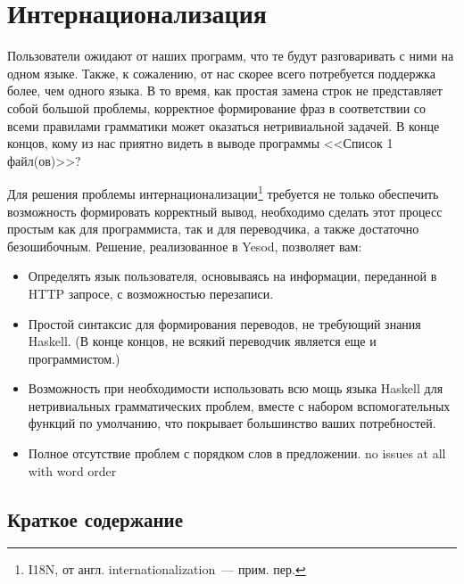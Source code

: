 \chapter{Интернационализация}\label{chap:i18n} %

Пользователи ожидают от наших программ, что те будут разговаривать с ними на
одном языке. Также, к сожалению, от нас скорее всего потребуется поддержка
более, чем одного языка. В то время, как простая замена строк не представляет
собой большой проблемы, корректное формирование фраз в соответствии со всеми
правилами грамматики может оказаться нетривиальной задачей. В конце концов,
кому из нас приятно видеть в выводе программы <<Список 1 файл(ов)>>?

Для решения проблемы интернационализации\footnote{I18N, от англ.
    internationalization~--- прим. пер.} требуется не только обеспечить
возможность формировать корректный вывод, необходимо сделать этот процесс
простым как для программиста, так и для переводчика, а также достаточно
безошибочным. Решение, реализованное в Yesod, позволяет вам:

\begin{itemize}
  \item Определять язык пользователя, основываясь на информации, переданной в
      HTTP запросе, с возможностью перезаписи.

  \item Простой синтаксис для формирования переводов, не требующий знания
      Haskell. (В конце концов, не всякий переводчик является еще и
      программистом.)

  \item Возможность при необходимости использовать всю мощь языка Haskell для
      нетривиальных грамматических проблем, вместе с набором вспомогательных
      функций по умолчанию, что покрывает большинство ваших потребностей.

  \item Полное отсутствие проблем с порядком слов в предложении. %
      no issues at all with word order
\end{itemize}

\section{Краткое содержание} %



